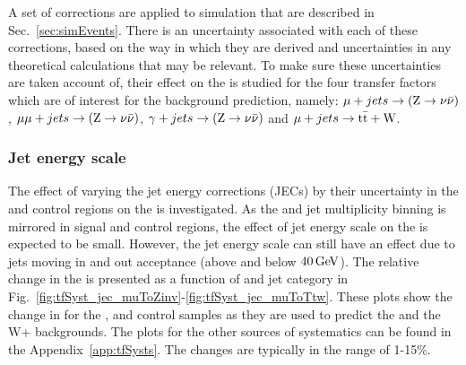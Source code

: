 A set of corrections are applied to simulation that are described in
Sec.~\ref{sec:simEvents}. There is an uncertainty associated with each
of these corrections, based on the way in which they are derived and
uncertainties in any theoretical calculations that may be relevant. To
make sure these uncertainties are taken account of, their effect on
the \TFs is studied for the four transfer factors which are of interest 
for the background prediction, namely: $\mu + jets \rightarrow ({\text Z} \rightarrow \nu\bar{\nu})$,
$\mu\mu + jets \rightarrow ({\text Z} \rightarrow \nu\bar{\nu})$, $\gamma + jets \rightarrow ({\text Z} \rightarrow \nu\bar{\nu})$ and $\mu + jets
\rightarrow \mathrm{t\bar{t}+W}$. 


\subsubsection*{Jet energy scale}
\label{sec:tfSyst_jec}
The effect of varying the jet energy corrections (JECs) by their uncertainty
in the \mj and \mmj control regions on the \TFs is investigated.  As
the \scalht and jet multiplicity binning is mirrored in signal and
control regions, the effect of jet energy scale on the \TFs
is expected to be small.  However, the jet energy scale can still have
an effect due to jets moving in and out acceptance (above and below
$40\mathrm{\,Ge\kern -0.1em V}$). The relative change in the \TFs is presented as
a function of \scalht and jet category in
Fig.~\ref{fig:tfSyst_jec_muToZinv}-\ref{fig:tfSyst_jec_muToTtw}. These
plots show the change in \TFs for the \mj, \mmj and \gj control
samples as they are used to predict the \znunu and the W+\ttbar
backgrounds. The plots for the other sources of systematics can be
found in the Appendix~\ref{app:tfSysts}. The
changes are typically in the range of 1-15\%.

